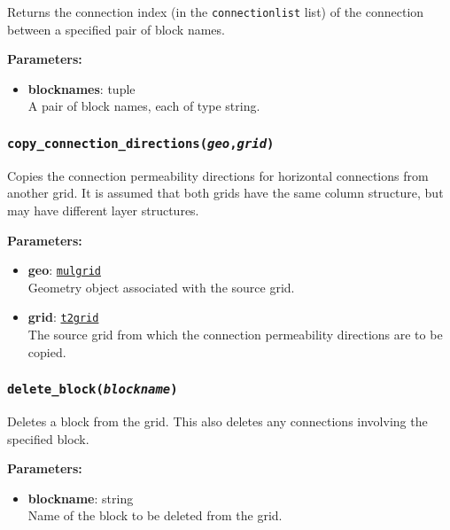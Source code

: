 Returns the connection index (in the \texttt{connectionlist} list) of the connection between a specified pair of block names.

\textbf{Parameters:}
\begin{itemize}
\item \textbf{blocknames}: tuple\\
  A pair of block names, each of type string.
\end{itemize}

\begin{snugshade}
\subsubsection{\texttt{copy\_connection\_directions(\emph{geo},\emph{grid})}}
\end{snugshade}
\label{sec:t2grid:copy_connection_directions}

Copies the connection permeability directions for horizontal connections from another grid.  It is assumed that both grids have the same column structure, but may have different layer structures.

\textbf{Parameters:}
\begin{itemize}
\item \textbf{geo}: \hyperref[mulgrids]{\texttt{mulgrid}}\\
  Geometry object associated with the source grid.
\item \textbf{grid}: \hyperref[t2grids]{\texttt{t2grid}}\\
  The source grid from which the connection permeability directions are to be copied.
\end{itemize}

\begin{snugshade}
\subsubsection{\texttt{delete\_block(\emph{blockname})}}
\end{snugshade}
\label{sec:t2grid:delete_block}

Deletes a block from the grid.  This also deletes any connections involving the specified block.

\textbf{Parameters:}
\begin{itemize}
\item \textbf{blockname}: string\\
  Name of the block to be deleted from the grid.
\end{itemize}

